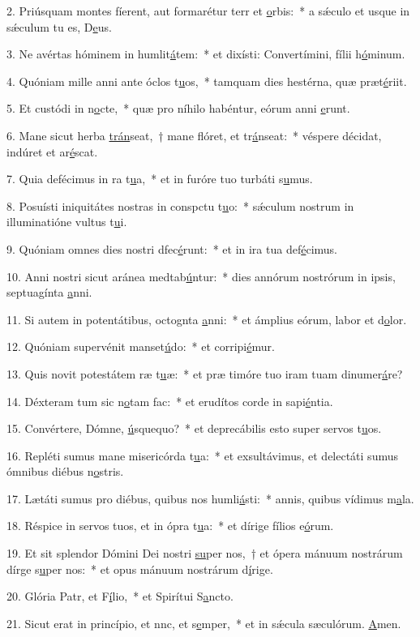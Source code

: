 2. Priúsquam montes fíerent, aut formarétur terr et \uline{o}rbis:~* a sǽculo et usque in sǽculum tu es, D\uline{e}us.\par 
3. Ne avértas hóminem in humlit\uline{á}tem:~* et dixísti: Convertímini, fílii h\uline{ó}minum.\par 
4. Quóniam mille anni ante óclos t\uline{u}os,~* tamquam dies hestérna, quæ præt\uline{é}riit.\par 
5. Et custódi in n\uline{o}cte,~* quæ pro níhilo habéntur, eórum anni \uline{e}runt.\par 
6. Mane sicut herba \uline{trán}seat,~† mane flóret, et tr\uline{á}nseat:~* véspere décidat, indúret et ar\uline{é}scat.\par 
7. Quia defécimus in ra t\uline{u}a,~* et in furóre tuo turbáti s\uline{u}mus.\par 
8. Posuísti iniquitátes nostras in conspctu t\uline{u}o:~* sǽculum nostrum in illuminatióne vultus t\uline{u}i.\par 
9. Quóniam omnes dies nostri dfec\uline{é}runt:~* et in ira tua def\uline{é}cimus.\par 
10. Anni nostri sicut aránea medtab\uline{ú}ntur:~* dies annórum nostrórum in ipsis, septuagínta \uline{a}nni.\par 
11. Si autem in potentátibus, octognta \uline{a}nni:~* et ámplius eórum, labor et d\uline{o}lor.\par 
12. Quóniam supervénit manset\uline{ú}do:~* et corripi\uline{é}mur.\par 
13. Quis novit potestátem ræ t\uline{u}æ:~* et præ timóre tuo iram tuam dinumer\uline{á}re?\par 
14. Déxteram tum sic n\uline{o}tam fac:~* et erudítos corde in sapi\uline{é}ntia.\par 
15. Convértere, Dómne, \uline{ú}squequo?~* et deprecábilis esto super servos t\uline{u}os.\par 
16. Repléti sumus mane misericórda t\uline{u}a:~* et exsultávimus, et delectáti sumus ómnibus diébus n\uline{o}stris.\par 
17. Lætáti sumus pro diébus, quibus nos humli\uline{á}sti:~* annis, quibus vídimus m\uline{a}la.\par 
18. Réspice in servos tuos, et in ópra t\uline{u}a:~* et dírige fílios e\uline{ó}rum.\par 
19. Et sit splendor Dómini Dei nostri \uline{su}per nos,~† et ópera mánuum nostrárum dírge s\uline{u}per nos:~* et opus mánuum nostrárum d\uline{í}rige.\par 
20. Glória Patr, et F\uline{í}lio,~* et Spirítui S\uline{a}ncto.\par 
21. Sicut erat in princípio, et nnc, et s\uline{e}mper,~* et in sǽcula sæculórum. \uline{A}men.\par 
